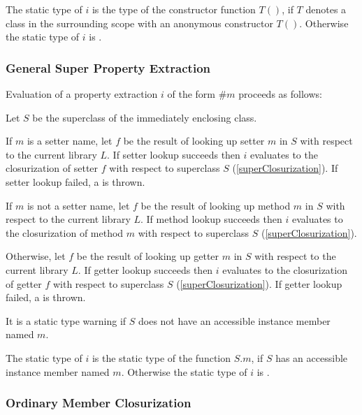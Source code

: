 \documentclass{article}
\begin{document}

\LMHash{}
The static type of $i$ is the type of the constructor function $T()$, if $T$ denotes a class in the surrounding scope with an anonymous constructor $T()$. Otherwise the static type of $i$ is \DYNAMIC{}.

\subsubsection{General Super Property Extraction}


\LMHash{}
Evaluation of a property extraction $i$ of the form \SUPER$\#m$ proceeds as follows:

 \LMHash{}
Let $S$ be the superclass of the immediately enclosing class.

 \LMHash{}
If $m$ is a setter name, let $f$ be the result of looking up setter $m$ in $S$ with respect to the current library $L$. If setter lookup succeeds then $i$ evaluates to the closurization of setter $f$  with respect to superclass $S$  (\ref{superClosurization}).  If setter lookup failed, a  is thrown.

If $m$ is not a setter name, let $f$ be the result of looking up method $m$ in $S$ with respect to the current library $L$. If method lookup succeeds then $i$ evaluates to the closurization of method $m$ with respect to superclass $S$ (\ref{superClosurization}).

\LMHash{}
 Otherwise, let $f$ be the result of looking up getter $m$ in $S$ with respect to the current library $L$.  If getter lookup succeeds then $i$ evaluates to the closurization of getter $f$ with respect to superclass $S$ (\ref{superClosurization}).   If getter lookup failed, a  is thrown.

\LMHash{}
It is a static type warning if $S$ does not have an accessible instance member named $m$.

\LMHash{}
The static type of $i$ is the static type of the function $S.m$,  if $S$ has an accessible instance member named $m$. Otherwise the static type of $i$ is \DYNAMIC{}.



\subsubsection{Ordinary Member Closurization}
\end{document}
